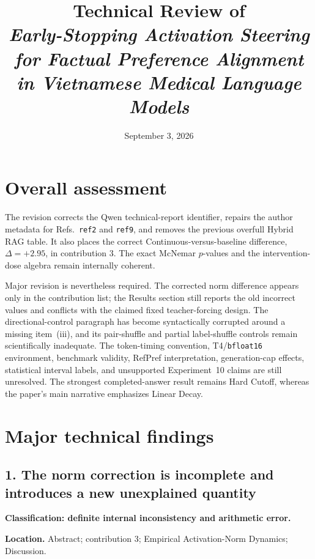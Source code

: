 \documentclass[11pt]{article}
\title{Technical Review of\\
\emph{Early-Stopping Activation Steering for Factual Preference Alignment in Vietnamese Medical Language Models}}
\author{}
\date{September 3, 2026}
\begin{document}
\maketitle

\section*{Overall assessment}

The revision corrects the Qwen technical-report identifier, repairs the author metadata for Refs.~\texttt{ref2} and \texttt{ref9}, and removes the previous overfull Hybrid RAG table.  It also places the correct Continuous-versus-baseline difference, $\Delta=+2.95$, in contribution 3.  The exact McNemar $p$-values and the intervention-dose algebra remain internally coherent.

Major revision is nevertheless required.  The corrected norm difference appears only in the contribution list; the Results section still reports the old incorrect values and conflicts with the claimed fixed teacher-forcing design.  The directional-control paragraph has become syntactically corrupted around a missing item~(iii), and its pair-shuffle and partial label-shuffle controls remain scientifically inadequate.  The token-timing convention, T4/\texttt{bfloat16} environment, benchmark validity, RefPref interpretation, generation-cap effects, statistical interval labels, and unsupported Experiment~10 claims are still unresolved.  The strongest completed-answer result remains Hard Cutoff, whereas the paper's main narrative emphasizes Linear Decay.

\section*{Major technical findings}

\subsection*{1. The norm correction is incomplete and introduces a new unexplained quantity}

\textbf{Classification: definite internal inconsistency and arithmetic error.}

\textbf{Location.} Abstract; contribution 3; Empirical Activation-Norm Dynamics; Discussion.
\end{document}
